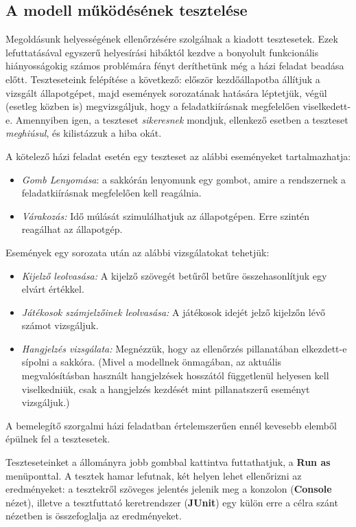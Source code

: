 \subsection{A modell működésének tesztelése}

Megoldásunk helyességének ellenőrzésére szolgálnak a kiadott tesztesetek. Ezek lefuttatásával egyszerű helyesírási hibáktól kezdve a bonyolult funkcionális hiányosságokig számos problémára fényt deríthetünk még a házi feladat beadása előtt. Teszteseteink felépítése a következő: először kezdőállapotba állítjuk a vizsgált állapotgépet, majd események sorozatának hatására léptetjük, végül (esetleg közben is) megvizsgáljuk, hogy a feladatkiírásnak megfelelően viselkedett-e. Amennyiben igen, a teszteset \emph{sikeresnek} mondjuk, ellenkező esetben a teszteset \emph{meghiúsul}, és kilistázzuk a hiba okát.

A kötelező házi feladat esetén egy teszteset az alábbi eseményeket tartalmazhatja:

\begin{itemize}
	\item \emph{Gomb Lenyomása}: a sakkórán lenyomunk egy gombot, amire a rendszernek a feladatkiírásnak megfelelően kell reagálnia.
	\item \emph{Várakozás:} Idő múlását szimulálhatjuk az állapotgépen. Erre szintén reagálhat az állapotgép.
\end{itemize}

Események egy sorozata után az alábbi vizsgálatokat tehetjük:

\begin{itemize}
	\item \emph{Kijelző leolvasása:} A kijelző szövegét betűről betűre összehasonlítjuk egy elvárt értékkel.
	\item \emph{Játékosok számjelzőinek leolvasása:} A játékosok idejét jelző kijelzőn lévő számot vizsgáljuk.
	\item \emph{Hangjelzés vizsgálata:} Megnézzük, hogy az ellenőrzés pillanatában elkezdett-e sípolni a sakkóra. (Mivel a modellnek önmagában, az aktuális megvalósításban használt hangjelzések hosszától függetlenül helyesen kell viselkedniük, csak a hangjelzés kezdését mint pillanatszerű eseményt vizsgáljuk.)
\end{itemize}

A bemelegítő szorgalmi házi feladatban értelemszerűen ennél kevesebb elemből épülnek fel a tesztesetek.

Teszteseteinket a  állományra jobb gombbal kattintva futtathatjuk, a \textbf{Run as} menüponttal. A tesztek hamar lefutnak, két helyen lehet ellenőrizni az eredményeket: a tesztekről szöveges jelentés jelenik meg a konzolon (\textbf{Console} nézet), illetve a tesztfuttató keretrendszer (\textbf{JUnit}) egy külön erre a célra szánt nézetben is összefoglalja az eredményeket.

